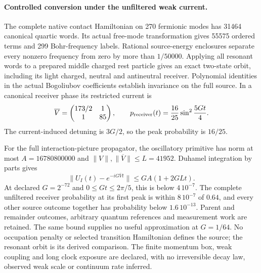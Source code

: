 \paragraph{Controlled conversion under the unfiltered weak current.}
The complete native contact Hamiltonian on 270 fermionic modes has
31464 canonical quartic words. Its actual free-mode transformation gives
55575 ordered terms and 299 Bohr-frequency labels. Rational source-energy
enclosures separate every nonzero frequency from zero by more than
$1/50000$. Applying all resonant words to a prepared middle charged rest
particle gives an exact two-state orbit, including its light charged,
neutral and antineutral receiver. Polynomial identities in the actual
Bogoliubov coefficients establish invariance on the full source. In a
canonical receiver phase its restricted current is
\[
 \overline V=\begin{pmatrix}173/2&1\\1&85\end{pmatrix},
 \qquad p_{\rm receiver}(t)=\frac{16}{25}\sin^2\frac{5Gt}{4}.
\]
The current-induced detuning is $3G/2$, so the peak probability is $16/25$.

For the full interaction-picture propagator, the oscillatory primitive has
norm at most $A=16780800000$ and $\|V\|,\|\overline V\|\leq L=41952$.
Duhamel integration by parts gives
\[
 \|U_I(t)-e^{-iG\overline Vt}\|\leq GA(1+2GLt).
\]
At declared $G=2^{-72}$ and $0\leq Gt\leq2\pi/5$, this is below
$4\,10^{-7}$. The complete unfiltered receiver probability at its first
peak is within $8\,10^{-7}$ of $0.64$, and every other source outcome
together has probability below $1.6\,10^{-13}$. Parent and remainder
outcomes, arbitrary quantum references and measurement work are retained.
The same bound supplies no useful approximation at $G=1/64$.
No occupation penalty or selected transition Hamiltonian defines the source;
the resonant orbit is its derived comparison. The finite momentum box,
weak coupling and long clock exposure are declared, with no irreversible
decay law, observed weak scale or continuum rate inferred.
